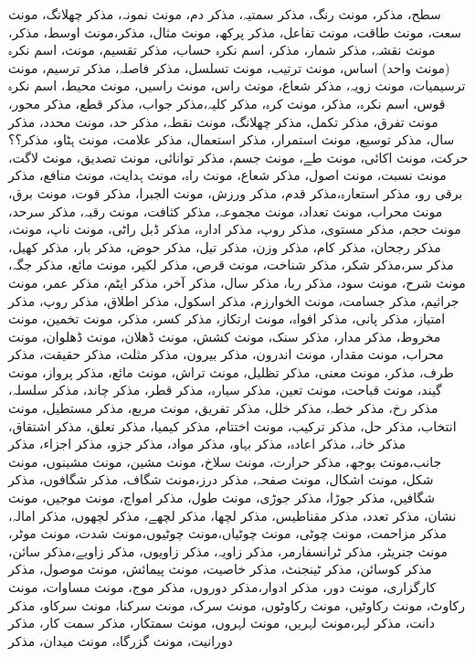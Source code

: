 سطح، مذکر، مونث
رنگ، مذکر
سمتیہ، مذکر
دم، مونث
نمونہ، مذکر
چھلانگ، مونث
سعت، مونث
طاقت، مونث
تفاعل، مذکر
پرکھ، مونث
مثال، مذکر،مونث
اوسط، مذکر، مونث
نقشہ، مذکر
شمار، مذکر، اسم نکرہ
حساب، مذکر
تقسیم، مونث، اسم نکرہ (مونث واحد)
اساس، مونث
ترتیب، مونث
تسلسل، مذکر
فاصلہ، مذکر
ترسیم، مونث
ترسیمیات، مونث
زویہ، مذکر
شعاع، مونث
راس، مونث
راسیں، مونث
محیط، اسم نکرہ
قوس، اسم نکرہ، مذکر، مونث
کرہ، مذکر
کلیہ،مذکر
جواب، مذکر
قطع، مذکر
محور، مونث
تفرق، مذکر
تکمل، مذکر
چھلانگ، مونث
نقطہ، مذکر
حد، مونث
محدد، مذکر
سال، مذکر
توسیع، مونث
استمرار، مذکر
استعمال، مذکر
علامت، مونث
ہٹاو، مذکر؟؟
حرکت، مونث
اکائی، مونث
طے، مونث
جسم، مذکر
توانائی، مونث
تصدیق، مونث
لاگت، مونث
نسبت، مونث
اصول، مذکر
شعاع، مونث
راہ، مونث
ہدایت، مونث
منافع، مذکر
برقی رو، مذکر
استعارہ،مذکر
قدم، مذکر
ورزش، مونث
الجبرا، مذکر
قوت، مونث
برق، مونث
محراب، مونث
تعداد، مونث
مجموعہ، مذکر
کثافت، مونث
رقبہ، مذکر
سرحد، مونث
حجم، مذکر
مستوی، مذکر
روپ، مذکر
ادارہ، مذکر
ڈبل راٹی، مونث
ناپ، مونث، مذکر
رجحان، مذکر
کام، مذکر
وزن، مذکر
تیل، مذکر
حوض، مذکر
بار، مذکر
کھیل، مذکر
سر،مذکر
شکر، مذکر
شناخت، مونث
 قرص، مذکر
لکیر، مونث
مائع، مذکر
جگہ، مونث
شرح، مونث
سود، مذکر
ربا، مذکر
سال، مذکر
آخر، مذکر
ایٹم، مذکر
عمر، مونث
جراثیم، مذکر
جسامت، مونث
الخوارزم، مذکر
اسکول، مذکر
اطلاق، مذکر
روپ، مذکر
امتیاز، مذکر
پانی، مذکر
افواہ، مونث
ارتکاز، مذکر
کسر، مذکر، مونث
تخمین، مونث
مخروط، مذکر
مدار، مذکر
سنک، مونث
کشش، مونث
ڈھلان، مونث
ڈھلوان، مونث
محراب، مونث
مقدار، مونث
اندرون، مذکر
بیرون، مذکر
مثلث، مذکر
حقیقت، مذکر
طرف، مذکر، مونث
معنی، مذکر
تظلیل، مونث
تراش، مونث
مائع، مذکر
پرواز، مونث
گیند، مونث
قباحت، مونث
تعین، مذکر
سیارہ، مذکر
قطر، مذکر
چاند، مذکر
سلسلہ، مذکر
رخ، مذکر
خطہ، مذکر
خلل، مذکر
تفریق، مونث
مربع، مذکر
مستطیل، مونث
انتخاب، مذکر
حل، مذکر
ترکیب، مونث
اختتام، مذکر
کیمیا، مذکر
تعلق، مذکر
اشتقاق، مذکر
خانہ، مذکر
اعادہ، مذکر
بہاو، مذکر
مواد، مذکر
جزو، مذکر
اجزاء، مذکر
جانب،مونث
بوجھ، مذکر
حرارت، مونث
سلاخ، مونث
مشین، مونث
مشینوں، مونث
شکل، مونث
اشکال، مونث
صفحہ، مذکر
درز،مونث
شگاف، مذکر
شگافوں، مذکر
شگافیں، مذکر
جوڑا، مذکر
جوڑی، مونث
طول، مذکر
امواج، مونث
موجیں، مونث
نشان، مذکر
تعدد، مذکر
مقناطیس، مذکر
لچھا، مذکر
لچھے، مذکر
لچھوں، مذکر
امالہ، مذکر
مزاحمت، مونث
چوٹی، مونث
چوٹیاں،مونث
چوٹیوں،مونث
شدت، مونث
موٹر، مونث
جنریٹر، مذکر
ٹرانسفارمر، مذکر
زاویہ، مذکر
زاویوں، مذکر
زاویے،مذکر
سائن، مذکر
کوسائن، مذکر
ٹینجنٹ، مذکر
خاصیت، مونث
پیمائش، مونث
موصول، مذکر
کارگزاری، مونث
دور، مذکر
ادوار،مذکر
دوروں، مذکر
موج، مونث
مساوات، مونث
رکاوٹ، مونث
رکاوٹیں، مونث
رکاوٹوں، مونث
سرک، مونث
سرکنا، مونث
سرکاو، مذکر
دانت، مذکر
لہر،مونث
لہریں، مونث
لہروں، مونث
سمتکار، مذکر
سمت کار، مذکر
دورانیت، مونث
گزرگاہ، مونث
میدان، مذکر

